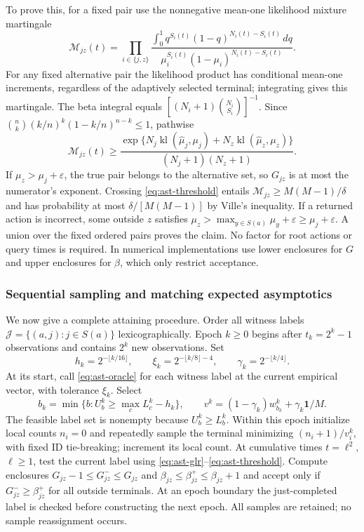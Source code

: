 \documentclass{article}
\theoremstyle{plain}
\theoremstyle{definition}
\begin{document}
To prove this, for a fixed pair use the nonnegative mean-one likelihood
mixture martingale
\[
 \mathcal M_{jz}(t)=\prod_{i\in\{j,z\}}
 \frac{\int_0^1q^{S_i(t)}(1-q)^{N_i(t)-S_i(t)}\,dq}
 {\mu_i^{S_i(t)}(1-\mu_i)^{N_i(t)-S_i(t)}}.
\]
For any fixed alternative pair the likelihood product has conditional
mean-one increments, regardless of the adaptively selected terminal;
integrating gives this martingale.  The beta integral equals
$[(N_i+1)\binom{N_i}{S_i}]^{-1}$.  Since
$\binom nk(k/n)^k(1-k/n)^{n-k}\le1$, pathwise
\[
 \mathcal M_{jz}(t)\ge
 \frac{\exp\{N_j\operatorname{kl}(\widehat\mu_j,\mu_j)
                   +N_z\operatorname{kl}(\widehat\mu_z,\mu_z)\}}
 {(N_j+1)(N_z+1)}.
\]
If $\mu_z>\mu_j+\varepsilon$, the true pair belongs to the alternative set,
so $G_{jz}$ is at most the numerator's exponent.  Crossing
\eqref{eq:ast-threshold} entails
$\mathcal M_{jz}\ge M(M-1)/\delta$ and has probability at most
$\delta/[M(M-1)]$ by Ville's inequality.  If a returned action is incorrect,
some outside $z$ satisfies
$\mu_z>\max_{y\in S(a)}\mu_y+\varepsilon\ge\mu_j+\varepsilon$.
A union over the fixed ordered pairs proves the claim.  No factor for root
actions or query times is required.  In numerical implementations use lower
enclosures for $G$ and upper enclosures for $\beta$, which only restrict
acceptance.

\subsubsection{Sequential sampling and matching expected asymptotics}
\label{app:ast-sequential}
We now give a complete attaining procedure.  Order all witness labels
$\mathcal J=\{(a,j):j\in S(a)\}$ lexicographically.  Epoch $k\ge0$ begins
after $t_k=2^k-1$ observations and contains $2^k$ new observations.  Set
\[
 h_k=2^{-\lfloor k/16\rfloor},\qquad
 \xi_k=2^{-\lfloor k/8\rfloor-4},\qquad
 \gamma_k=2^{-\lfloor k/4\rfloor}.
\]
At its start, call \eqref{eq:ast-oracle} for each witness label at the current
empirical vector, with tolerance $\xi_k$.  Select
\begin{equation}
 b_k=\min\{b:U_b^k\ge\max_cL_c^k-h_k\},\qquad
 v^k=(1-\gamma_k)w_{b_k}^k+\gamma_k\mathbf1/M.
 \label{eq:ast-sticky}
\end{equation}
The feasible label set is nonempty because $U_b^k\ge L_b^k$.
Within this epoch initialize local counts $n_i=0$ and repeatedly sample the
terminal minimizing $(n_i+1)/v_i^k$, with fixed ID tie-breaking; increment
its local count.  At cumulative times $t=\ell^2$, $\ell\ge1$, test the
current label using \eqref{eq:ast-glr}--\eqref{eq:ast-threshold}.  Compute
enclosures $G_{jz}-1\le G_{jz}^-\le G_{jz}$ and
$\beta_{jz}\le\beta_{jz}^+\le\beta_{jz}+1$ and accept only if
$G_{jz}^-\ge\beta_{jz}^+$ for all outside terminals.
At an epoch boundary the just-completed label is checked before constructing
the next epoch.  All samples are retained; no sample reassignment occurs.
\end{document}

